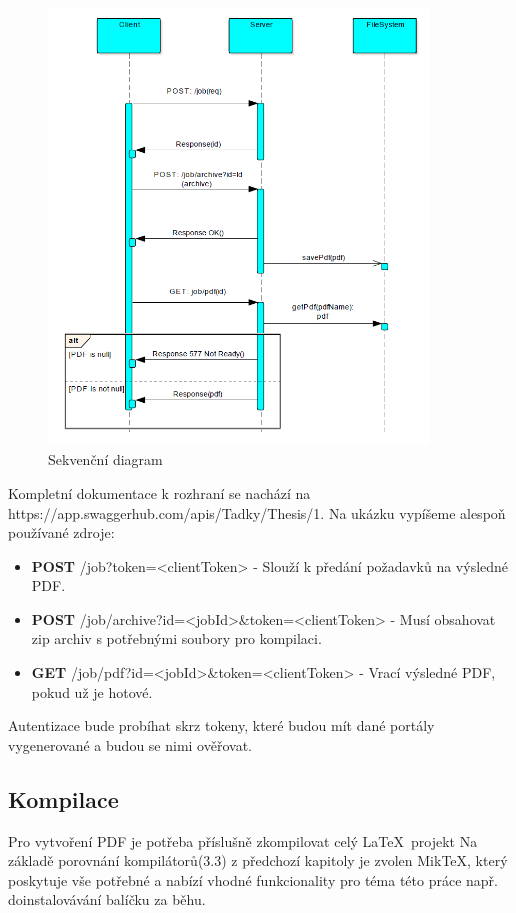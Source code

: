 \begin{figure}[H]
	\includegraphics[width=0.9\textwidth]{diagram}
	\centering
	\caption{Sekvenční diagram}
	\label{fig:seq}
\end{figure}

Kompletní dokumentace k rozhraní se nachází na https://app.swaggerhub.com/apis/Tadky/Thesis/1. Na ukázku vypíšeme alespoň používané zdroje:
\begin{itemize}
	\item \textbf{POST} {\ttfamily /job?token=<clientToken>} - Slouží k předání požadavků na výsledné PDF.
	\item \textbf{POST} {\ttfamily /job/archive?id=<jobId>\&token=<clientToken>} - Musí obsahovat zip archiv s potřebnými soubory pro kompilaci.
	\item \textbf{GET} {\ttfamily /job/pdf?id=<jobId>\&token=<clientToken>} - Vrací výsledné PDF, pokud už je hotové.
\end{itemize}

Autentizace bude probíhat skrz tokeny, které budou mít dané portály vygenerované a budou se nimi ověřovat.

\subsection{Kompilace}
Pro vytvoření PDF je potřeba příslušně zkompilovat celý \LaTeX\ projekt 
Na základě porovnání kompilátorů(3.3) z předchozí kapitoly je zvolen MikTeX, který poskytuje vše potřebné a nabízí vhodné funkcionality pro téma této práce např. doinstalovávání balíčku za běhu. 

